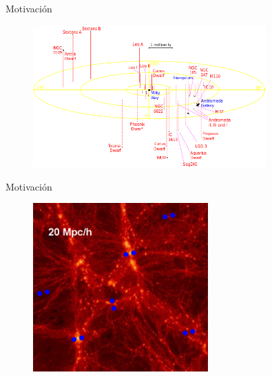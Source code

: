 \documentclass[8pt,fleqn]{beamer}
\begin{document}
\begin{frame}
\begin{block}{Motivación}\justifying
\begin{figure}[htbp]
	\centering
	\includegraphics[trim = 0mm 0mm 0mm 0mm, clip, width=0.8\textwidth]
	{./figures/LocalGroup.png}
\end{figure}
\end{block}
\end{frame}
\begin{frame}
\begin{block}{Motivación}\justifying
\begin{figure}[htbp]
	\centering
	\includegraphics[trim = 0mm 0mm 0mm 0mm, clip, width=0.6\textwidth]
	{./figures/Pairs_in_Web.png}
\end{figure}
\end{block}
\end{frame}
\end{document}
